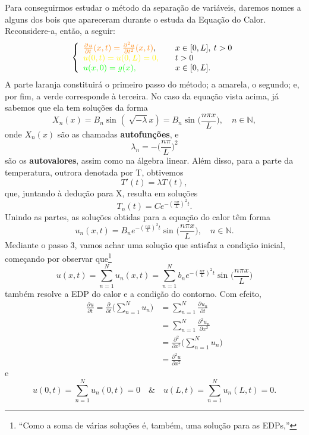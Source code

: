 \documentclass[../pde_notes.tex]{subfiles}
\begin{document}
\begin{example}
	Para conseguirmos estudar o método da separação de variáveis, daremos nomes a alguns dos bois que apareceram durante o estuda da Equação do Calor. Reconsidere-a, então, a seguir:
	\[
		\left\{\begin{array}{ll}
			{\color{orange}\frac{\partial^{}u}{\partial t^{}}(x, t)=\frac{\partial^{2}u}{\partial t^{2}}(x, t)}, & \quad x\in [0, L],\: t>0 \\
			{\color{yellow}u(0, t)=u(0, L)=0,                 }                                                  & \quad t>0                \\
			{\color{green}u(x, 0) = g(x),                      }                                                 & \quad x\in [0, L].
		\end{array}\right.
	\]
	A parte laranja constituirá o primeiro passo do método; a amarela, o segundo; e, por fim, a verde corresponde à terceira. No caso da equação vista acima, já sabemos que ela tem soluções da forma
	\[
		X_{n}(x) = B_{n}\sin^{}{(\sqrt[]{-\lambda }x)} = B_{n}\sin^{}{\biggl(\frac{n\pi x}{L}\biggr)}, \quad n\in \mathbb{N},
	\]
	onde \(X_{n}(x)\) são as chamadas \textbf{autofunções}, e
	\[
		\lambda_{n} = -\biggl(\frac{n\pi }{L}\biggr)^{2}
	\]
	são os \textbf{autovalores}, assim como na álgebra linear. Além disso, para a parte da temperatura, outrora denotada por T, obtivemos
	\[
		T'(t)=\lambda T(t),
	\]
	que, juntando à dedução para X, resulta em soluções
	\[
		T_{n}(t)=Ce^{-\left(\frac{n\pi }{L}\right)^{2}t}.
	\]
	Unindo as partes, as soluções obtidas para a equação do calor têm forma
	\[
		u_{n}(x, t)=B_{n}e^{-\left(\frac{n\pi }{L}\right)^{2}t}\sin^{}{\biggl(\frac{n\pi x}{L}\biggr)},\quad n\in \mathbb{N}.
	\]
	Mediante o {\color{green}passo 3}, vamos achar uma solução que satisfaz a condição inicial, começando por observar que\footnote{``Como a soma de várias soluções é, também, uma solução para as EDPs,''}
	\[
		u(x, t)=\sum\limits_{n=1}^{N}u_{n}(x, t)=\sum\limits_{n=1}^{N}b_{n}e^{-\left(\frac{n\pi }{L}\right)^{2}t}\sin^{}{\biggl(\frac{n\pi x}{L}\biggr)}
	\]
	também resolve a EDP do calor e a condição do contorno. Com efeito,
	\begin{align*}
		\frac{\partial^{}u}{\partial t^{}}=\frac{\partial^{}}{\partial t^{}}\biggl(\sum\limits_{n=1}^{N}u_{n}\biggr) & =\sum\limits_{n=1}^{N}\frac{\partial^{}u_{n}}{\partial t^{}}                 \\
		                                                                                                             & =\sum\limits_{n=1}^{N}\frac{\partial^{2}u_{n}}{\partial x^{2}}               \\
		                                                                                                             & =\frac{\partial^{2}}{\partial x^{2}}\biggl(\sum\limits_{n=1}^{N}u_{n}\biggr) \\
		                                                                                                             & = \frac{\partial^{2}u}{\partial x^{2}}
	\end{align*}
	e
	\[
		u(0,t)=\sum\limits_{n=1}^{N}u_{n}(0, t)=0 \quad\&\quad u(L, t)=\sum\limits_{n=1}^{N}u_{n}(L, t)=0.
	\]


\end{example}
\end{document}
